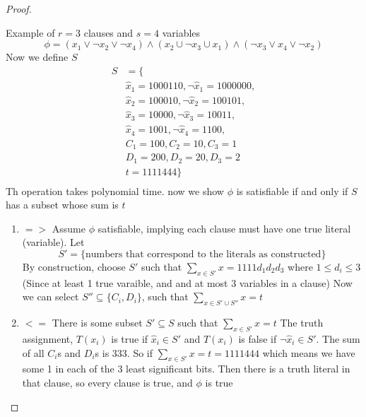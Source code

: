 \documentclass[11pt]{article}
\begin{document}
\begin{example}
\begin{proof}
\begin{enumerate}
            Example of $r = 3$ clauses and $s =4$ variables
            \[  
                \phi = (x_1 \lor \neg x_2 \lor \neg x_4) \land (x_2 \cup \neg x_3 \cup x_1) \land (\neg x_3 \lor x_4 \lor \neg x_2)
            \]
            Now we define $S$ 
            \begin{align*}
                 S &= \{\\
                    &\hat{x}_1 = 1000110, \neg \hat{x}_1 = 1000000, \\
                    &\hat{x}_2 = 100010, \neg\hat{x}_2 = 100101, \\ 
                    &\hat{x}_3 = 10000, \neg \hat{x}_3 = 10011, \\
                    &\hat{x}_4 = 1001, \neg\hat{x}_4 = 1100, \\ 
                    &C_1 = 100, C_2 = 10, C_3 = 1 \\
                    &D_1 = 200, D_2 = 20, D_3 = 2 \\
                    &t = 1111444 \}\\ 
            \end{align*}
            Th operation takes polynomial time. now we show $\phi$ is satisfiable if and only if $S$ has a subset whose sum is $t$
            \begin{enumerate}
                \item $=>$ Assume $\phi$ satisfiable, implying each clause must have one true literal (variable). Let
                \[
                    S' = \{ \text{numbers that correspond to the literals as constructed} \}
                \] 
                By construction, choose $S'$ such that $\sum_{x\in S'} x = 1111d_1 d_2 d_3$ where $1 \leq d_i \leq 3$ (Since at least 1 true varaible, and and at most 3 variables in a clause) Now we can select $S''\subseteq \{ C_i, D_i\}$, such that $\sum_{x\in S' \cup S''} x = t$
                \item $<=$ There is some subset $S' \subseteq S$ such that $\sum_{x\in S'} x=  t$ The truth assignment, $T(x_i)$ is true if $\hat{x}_i \in S'$ and $T(x_i)$ is false if $\neg \hat{x}_i \in S'$. The sum of all $C_i$s and $D_i$s is 333. So if $\sum_{x\in S'}x = t = 1111444$ which means we have some 1 in each of the 3 least significant bits. Then there is a truth literal in that clause, so every clause is true, and $\phi$ is true
            \end{enumerate}
        \end{enumerate}
    \end{proof}
\end{example}
\end{document}
